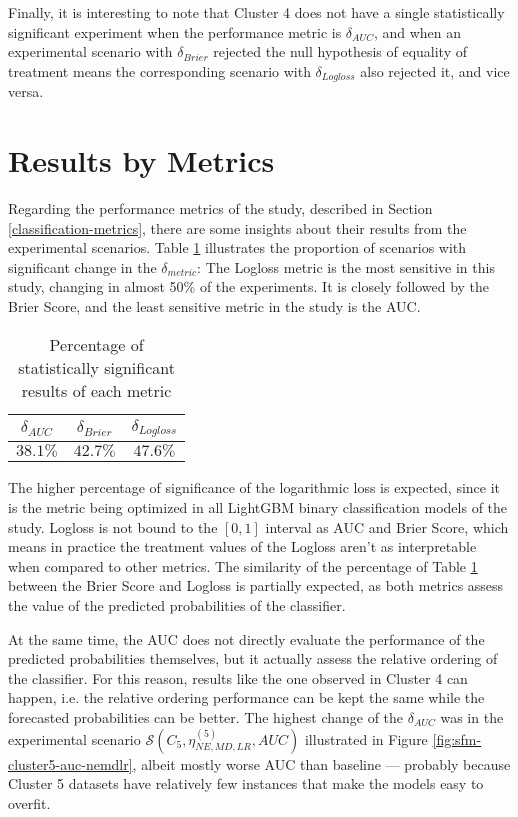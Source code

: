 Finally, it is interesting to note that Cluster 4 does not have a single statistically significant experiment when the performance metric is $\delta_{AUC}$, and when an experimental scenario with $\delta_{Brier}$ rejected the null hypothesis of equality of treatment means the corresponding scenario with $\delta_{Logloss}$ also rejected it, and vice versa.

\section{Results by Metrics}

Regarding the performance metrics of the study, described in  Section \ref{classification-metrics}, there are some insights about their results from the experimental scenarios. Table \ref{table:stats-metrics} illustrates the proportion of scenarios with significant change in the $\delta_{metric}$: The Logloss metric is the most sensitive in this study, changing in almost 50\% of the experiments. It is closely followed by the Brier Score, and the least sensitive metric in the study is the AUC.

\begin{table}[H]
    \centering
    \begin{tabular}{ccc}
              \textbf{$\delta_{AUC}$} & \textbf{$\delta_{Brier}$} & \textbf{$\delta_{Logloss}$} \\
              \midrule
              $38.1\%$&$42.7\%$&$47.6\%$
    \end{tabular}
    \caption{Percentage of statistically significant results of each metric}
    \label{table:stats-metrics}
\end{table}

The higher percentage of significance of the logarithmic loss is expected, since it is the metric being optimized in all LightGBM binary classification models of the study. Logloss is not bound to the $\left[0, 1\right]$ interval as AUC and Brier Score, which means in practice the treatment values of the Logloss aren't as interpretable when compared to other metrics. The similarity of the percentage of Table \ref{table:stats-metrics} between the Brier Score and Logloss is partially expected, as both metrics assess the value of the predicted probabilities of the classifier.

At the same time, the AUC does not directly evaluate the performance of the predicted probabilities themselves, but it actually assess the relative ordering of the classifier. For this reason, results like the one observed in Cluster 4 can happen, i.e. the relative ordering performance can be kept the same while the forecasted probabilities can be better. The highest change of the $\delta_{AUC}$ was in the experimental scenario $\mathcal{S}(C_5, \eta^{(5)}_{NE, MD, LR}, AUC)$ illustrated in Figure \ref{fig:sfm-cluster5-auc-nemdlr}, albeit mostly worse AUC than baseline --- probably because Cluster 5 datasets have relatively few instances that make the models easy to overfit.

